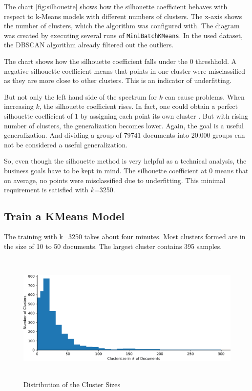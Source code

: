The chart \ref{fig:silhouette} shows how the silhouette coefficient behaves with respect to k-Means models with different numbers of clusters. The x-axis shows the number of clusters, which the algorithm was configured with. The diagram was created by executing several runs of \lstinline|MiniBatchKMeans|. In the used dataset, the DBSCAN algorithm already filtered out the outliers.

The chart shows how the silhouette coefficient falls under the 0 threshhold. A negative silhouette coefficient means that points in one cluster were misclassified as they are more close to other clusters. This is an indicator of underfitting. 

But not only the left hand side of the spectrum for $k$ can cause problems. When increasing $k$, the silhouette coefficient rises. In fact, one could obtain a perfect silhouette coefficient of 1 by assigning each point its own cluster \cite{yildirimTwoChallengesKMeans2020}. But with rising number of clusters, the generalization becomes lower. Again, the goal is a useful generalization. And dividing a group of 79741 documents into 20.000 groups can not be considered a useful generalization.

So, even though the silhouette method is very helpful as a technical analysis, the business goals have to be kept in mind. The silhouette coefficient at 0 means that on average, no points were misclassified due to underfitting. This minimal requirement is satisfied with $k$=3250.

\subsection{Train a KMeans Model}

The training with k=3250 takes about four minutes. Most clusters formed are in the size of 10 to 50 documents. The largest cluster contains 395 samples.

\begin{figure}[!h]
	\centering
	\includegraphics[height=6.5cm]{Bilder/models/clustersize.pdf}
	\caption{Distribution of the Cluster Sizes}
	\label{fig:clustersize}
\end{figure}

